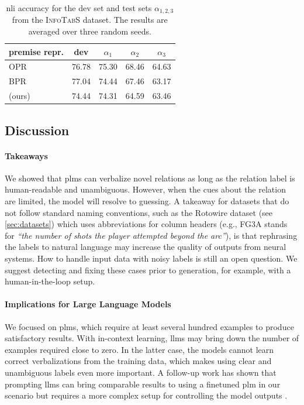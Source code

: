 \begin{table}[h]\centering
    \small
    \setlength{\tabcolsep}{4pt}
    \begin{tabular}{lcccc}\toprule
        \textbf{premise repr.}              & \textbf{dev} & $\alpha_1$ & $\alpha_2$ & $\alpha_3$ \\\midrule
        OPR \cite{gupta2020infotabs}        & 76.78        & 75.30      & 68.46      & 64.63      \\
        BPR \cite{neeraja2021incorporating} & 77.04        & 74.44      & 67.46      & 63.17      \\
        \BARTr{} (ours)                     & 74.44        & 74.31      & 64.59      & 63.46      \\
        \bottomrule
    \end{tabular}
    \caption[NLI accuracy on the \textsc{InfoTabS} dataset.]{\ac{nli} accuracy for the dev set and test sets  $\alpha_{1,2,3}$ from the \textsc{InfoTabS} dataset. The results are averaged over three random seeds.}
    \label{tab:rel2text:nli}
\end{table}

\subsection{Discussion}

\paragraph{Takeaways} We showed that \acp{plm} can verbalize novel relations as long as the relation label is human-readable and unambiguous. However, when the cues about the relation are limited, the model will resolve to guessing. A takeaway for datasets that do not follow standard naming conventions, such as the Rotowire dataset (see \autoref{sec:datasets}) which uses abbreviations for column headers (e.g., FG3A stands for \textit{``the number of shots the player attempted beyond the arc''}), is that rephrasing the labels to natural language may increase the quality of outputs from neural systems. How to handle input data with noisy labels is still an open question. We suggest detecting and fixing these cases prior to generation, for example, with a human-in-the-loop setup.


\paragraph{Implications for Large Language Models} We focused on \acp{plm}, which require at least several hundred examples to produce satisfactory results. With in-context learning, \acp{llm} may bring down the number of examples required close to zero. In the latter case, the models cannot learn correct verbalizations from the training data, which makes using clear and unambiguous labels even more important. A follow-up work has shown that prompting \acp{llm} can bring comparable results to using a finetuned \ac{plm} in our scenario but requires a more complex setup for controlling the model outputs \cite{vejvarASPIROAnyshotStructured2023}.

